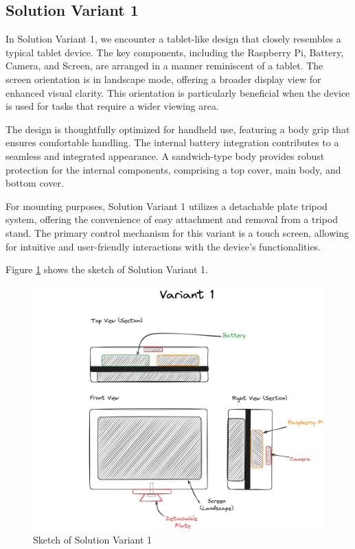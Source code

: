 \subsection{Solution Variant 1}
In Solution Variant 1, we encounter a tablet-like design that closely resembles a typical tablet device. The key components, including the Raspberry Pi, Battery, Camera, and Screen, are arranged in a manner reminiscent of a tablet. The screen orientation is in landscape mode, offering a broader display view for enhanced visual clarity. This orientation is particularly beneficial when the device is used for tasks that require a wider viewing area.

The design is thoughtfully optimized for handheld use, featuring a body grip that ensures comfortable handling. The internal battery integration contributes to a seamless and integrated appearance. A sandwich-type body provides robust protection for the internal components, comprising a top cover, main body, and bottom cover.

For mounting purposes, Solution Variant 1 utilizes a detachable plate tripod system, offering the convenience of easy attachment and removal from a tripod stand. The primary control mechanism for this variant is a touch screen, allowing for intuitive and user-friendly interactions with the device's functionalities.

Figure \ref{fig:sketch-solution-variant-1} shows the sketch of Solution Variant 1.

\begin{figure}[H]
    \centering
    \includegraphics[width=0.75\linewidth]{texs/Part1/chapter3/image/v1.png}
    \caption{Sketch of Solution Variant 1}
    \label{fig:sketch-solution-variant-1}
\end{figure}


